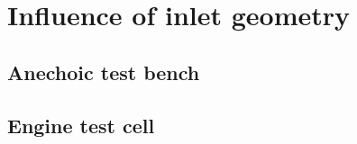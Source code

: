 \chapter{Influence of inlet geometry} %
\label{cap:geom}
\section{Anechoic test bench} %
\section{Engine test cell} %